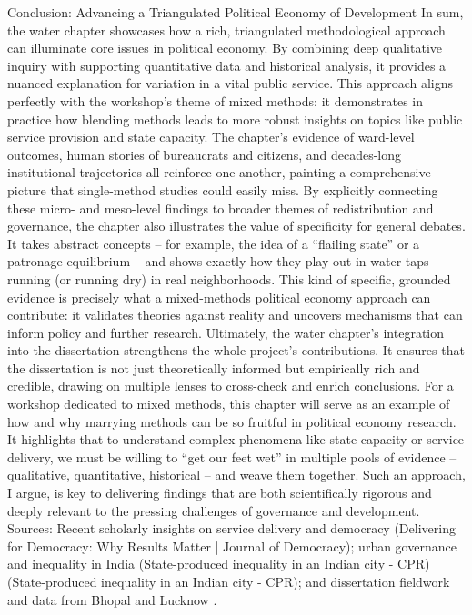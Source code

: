 Conclusion: Advancing a Triangulated Political Economy of Development
In sum, the water chapter showcases how a rich, triangulated methodological approach can illuminate core issues in political economy. By combining deep qualitative inquiry with supporting quantitative data and historical analysis, it provides a nuanced explanation for variation in a vital public service. This approach aligns perfectly with the workshop’s theme of mixed methods: it demonstrates in practice how blending methods leads to more robust insights on topics like public service provision and state capacity. The chapter’s evidence of ward-level outcomes, human stories of bureaucrats and citizens, and decades-long institutional trajectories all reinforce one another, painting a comprehensive picture that single-method studies could easily miss.
By explicitly connecting these micro- and meso-level findings to broader themes of redistribution and governance, the chapter also illustrates the value of specificity for general debates. It takes abstract concepts – for example, the idea of a “flailing state” or a patronage equilibrium – and shows exactly how they play out in water taps running (or running dry) in real neighborhoods. This kind of specific, grounded evidence is precisely what a mixed-methods political economy approach can contribute: it validates theories against reality and uncovers mechanisms that can inform policy and further research.
Ultimately, the water chapter’s integration into the dissertation strengthens the whole project’s contributions. It ensures that the dissertation is not just theoretically informed but empirically rich and credible, drawing on multiple lenses to cross-check and enrich conclusions. For a workshop dedicated to mixed methods, this chapter will serve as an example of how and why marrying methods can be so fruitful in political economy research. It highlights that to understand complex phenomena like state capacity or service delivery, we must be willing to “get our feet wet” in multiple pools of evidence – qualitative, quantitative, historical – and weave them together. Such an approach, I argue, is key to delivering findings that are both scientifically rigorous and deeply relevant to the pressing challenges of governance and development.
Sources: Recent scholarly insights on service delivery and democracy (Delivering for Democracy: Why Results Matter | Journal of Democracy); urban governance and inequality in India (State-produced inequality in an Indian city - CPR) (State-produced inequality in an Indian city - CPR); and dissertation fieldwork and data from Bhopal and Lucknow  .



